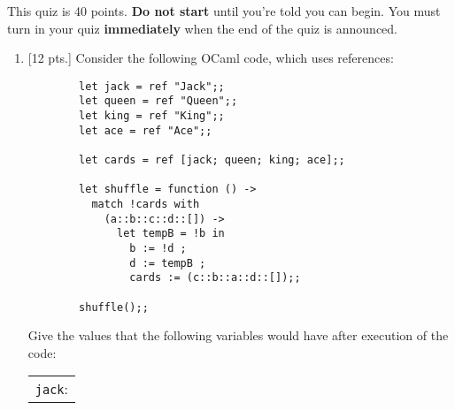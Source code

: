 \documentclass[11pt]{article}
\begin{document}
  \hspace{\fill}%
  \nameblock

  \smallskip


  \vspace{-3mm}

    \noindent
    This quiz is 40 points.  \textbf{Do not start} until you're told you can
  begin.  You must turn in your quiz \textbf{immediately} when the end of
  the quiz is announced.

  \vspace{-2mm}

  \begin{enumerate}

    \addtolength{\itemsep}{10mm}

    \item {[12 pts.]} Consider the following OCaml code, which uses
          references:

          \vspace{-.5mm}

          \begin{multicols}{2}

            \begin{BVerbatim}
        let jack = ref "Jack";;
        let queen = ref "Queen";;
        let king = ref "King";;
        let ace = ref "Ace";;

        let cards = ref [jack; queen; king; ace];;

        let shuffle = function () ->
          match !cards with
            (a::b::c::d::[]) ->
              let tempB = !b in
                b := !d ;
                d := tempB ;
                cards := (c::b::a::d::[]);;

        shuffle();;
            \end{BVerbatim}

            \columnbreak

            Give the values that the following variables would have after
            execution of the code:

            {

              \renewcommand{\arraystretch}{3}

              \begin{tabular}[t]{l@{\hspace{2mm}\ans[2.5in]}}

                \texttt{jack}:
                  \\


\end{tabular}}
\end{multicols}
\end{enumerate}
\end{document}
